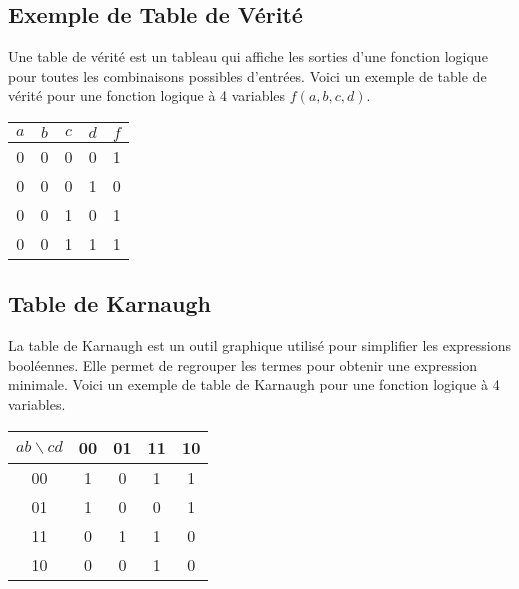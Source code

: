 \documentclass[10pt,a4paper]{article}
\begin{document}
\subsection*{Exemple de Table de Vérité}

Une table de vérité est un tableau qui affiche les sorties d'une fonction logique pour toutes les combinaisons possibles d'entrées. Voici un exemple de table de vérité pour une fonction logique à 4 variables \( f(a, b, c, d) \).


\begin{center}
    \begin{tabular}{|c|c|c|c|c|}
    \hline
    \(a\) & \(b\) & \(c\) & \(d\) & \(f\) \\
    \hline
    0 & 0 & 0 & 0 & 1 \\
    0 & 0 & 0 & 1 & 0 \\
    0 & 0 & 1 & 0 & 1 \\
    0 & 0 & 1 & 1 & 1 \\
    \hline
    \end{tabular}
\end{center}

\subsection*{Table de Karnaugh}

La table de Karnaugh est un outil graphique utilisé pour simplifier les expressions booléennes. Elle permet de regrouper les termes pour obtenir une expression minimale. Voici un exemple de table de Karnaugh pour une fonction logique à 4 variables.


\begin{center}
    \begin{tabular}{|c|c|c|c|c|}
    \hline
    \(ab\backslash cd\) & 00 & 01 & 11 & 10 \\
    \hline
    00 & 1 & 0 & 1 & 1 \\
    \hline
    01 & 1 & 0 & 0 & 1 \\
    \hline
    11 & 0 & 1 & 1 & 0 \\
    \hline
    10 & 0 & 0 & 1 & 0 \\
    \hline
    \end{tabular}
\end{center}
\end{document}
